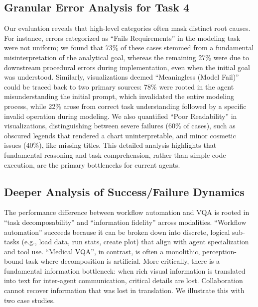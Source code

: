 \documentclass{article}
\begin{document}
\subsection{Granular Error Analysis for Task 4}

Our evaluation reveals that high-level categories often mask distinct root causes. For instance, errors categorized as ``Fails Requirements'' in the modeling task were not uniform; we found that 73\% of these cases stemmed from a fundamental misinterpretation of the analytical goal, whereas the remaining 27\% were due to downstream procedural errors during implementation, even when the initial goal was understood. Similarly, visualizations deemed ``Meaningless (Model Fail)'' could be traced back to two primary sources: 78\% were rooted in the agent misunderstanding the initial prompt, which invalidated the entire modeling process, while 22\% arose from correct task understanding followed by a specific invalid operation during modeling. We also quantified ``Poor Readability'' in visualizations, distinguishing between severe failures (60\% of cases), such as obscured legends that rendered a chart uninterpretable, and minor cosmetic issues (40\%), like missing titles. This detailed analysis highlights that fundamental reasoning and task comprehension, rather than simple code execution, are the primary bottlenecks for current agents.

\subsection{Deeper Analysis of Success/Failure Dynamics}
The performance difference between workflow automation and VQA is rooted in ``task decomposability'' and ``information fidelity'' across modalities. ``Workflow automation'' succeeds because it can be broken down into discrete, logical sub-tasks (e.g., load data, run stats, create plot) that align with agent specialization and tool use. ``Medical VQA'', in contrast, is often a monolithic, perception-bound task where decomposition is artificial. More critically, there is a fundamental information bottleneck: when rich visual information is translated into text for inter-agent communication, critical details are lost. Collaboration cannot recover information that was lost in translation. We illustrate this with two case studies.
\end{document}
